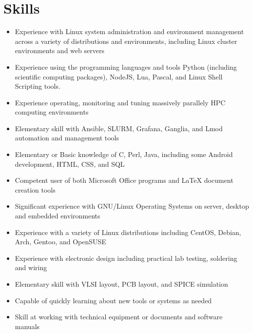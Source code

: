 \documentclass[10pt,a4paper,notitlepage]{article}
\begin{document}
\section*{Skills}
\begin{itemize}[noitemsep]
	\setlength\itemsep{0.02em}
    \item Experience with Linux system administration and environment management across a variety of distributions and environments, including Linux cluster environments and web servers
    \item Experience using the programming languages and tools Python (including scientific computing packages), NodeJS, Lua, Pascal, and Linux Shell Scripting tools.
    \item Experience operating, monitoring and tuning massively parallely HPC computing environments
    \item Elementary skill with Ansible, SLURM, Grafana, Ganglia, and Lmod automation and management tools
    \item Elementary or Basic knowledge of C, Perl, Java, including some Android development, HTML, CSS, and SQL
    \item Competent user of both Microsoft Office programs and LaTeX document creation tools
    \item Significant experience with GNU/Linux Operating Systems on server, desktop and embedded environments
    \item Experience with a variety of Linux distributions including CentOS, Debian, Arch, Gentoo, and OpenSUSE
    \item Experience with electronic design including practical lab testing, soldering and wiring
    \item Elementary skill with VLSI layout, PCB layout, and SPICE simulation
    \item Capable of quickly learning about new tools or systems as needed
    \item Skill at working with technical equipment or documents and software manuals
\end{itemize}
\end{document}
